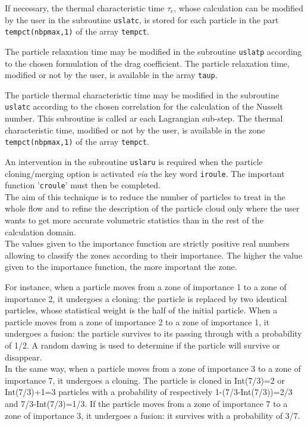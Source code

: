 {{\noindent
If necessary, the thermal characteristic time $\tau_c$, whose calculation can be modified by the user in the subroutine
\texttt{uslatc}, is stored for each particle in the part \texttt{tempct(nbpmax,1)} of the array \texttt{tempct}.


\noindent
The particle relaxation time may be modified in the subroutine \texttt{uslatp} according to the chosen formulation of the drag coefficient. The particle relaxation time, modified or not by the user, is available in the array \texttt{taup}.



\noindent
The particle thermal characteristic time may be modified in the subroutine \texttt{uslatc} according to the chosen correlation for the calculation of the Nusselt number. This subroutine is called ar each Lagrangian sub-step. The thermal characteristic time, modified or not by the user, is available in the zone \texttt{tempct(nbpmax,1)} of the array \texttt{tempct}.




\noindent
An intervention in the subroutine \texttt{uslaru} is required when the particle
cloning/merging option is activated {\em via} the key word \texttt{iroule}. The
important function '\texttt{croule}' must then be completed. \\
The aim of this technique is to reduce the number of particles to treat in
the whole flow and to refine the description of the particle cloud only
where the user wants to get more accurate volumetric statistics than in the
rest of the calculation domain. \\
The values given to the importance function are strictly positive real
numbers allowing to classify the zones according to their
importance. The higher the value given to the importance function, the
more important the zone.

\noindent
For instance, when a particle moves from a zone of importance 1 to a
zone of importance 2, it undergoes a cloning: the particle is replaced by two
identical particles, whose statistical weight is the half of the initial
particle. When a particle moves from a zone of importance 2 to a zone of
importance 1, it undergoes a fusion: the particle survives to its passing
through with a probability of 1/2. A random dawing is used to
determine if the particle will survive or disappear.\\
In the same way, when a particle moves from a zone of importance 3 to a
zone of importance 7, it undergoes a cloning. The particle is cloned in
Int(7/3)=2 or Int(7/3)+1=3 particles with a probability of respectively
1-(7/3-Int(7/3))=2/3 and 7/3-Int(7/3)=1/3. If the particle moves from a
zone of importance 7 to a zone of importance 3, it undergoes a fusion:
it survives with a probability of 3/7.

}}
